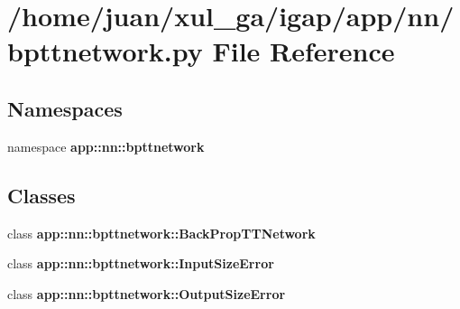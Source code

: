 \section{/home/juan/xul\_\-ga/igap/app/nn/bpttnetwork.py File Reference}
\label{bpttnetwork_8py}
\subsection*{Namespaces}
\begin{CompactItemize}
\item 
namespace {\bf app::nn::bpttnetwork}
\end{CompactItemize}
\subsection*{Classes}
\begin{CompactItemize}
\item 
class {\bf app::nn::bpttnetwork::BackPropTTNetwork}
\item 
class {\bf app::nn::bpttnetwork::InputSizeError}
\item 
class {\bf app::nn::bpttnetwork::OutputSizeError}
\end{CompactItemize}
